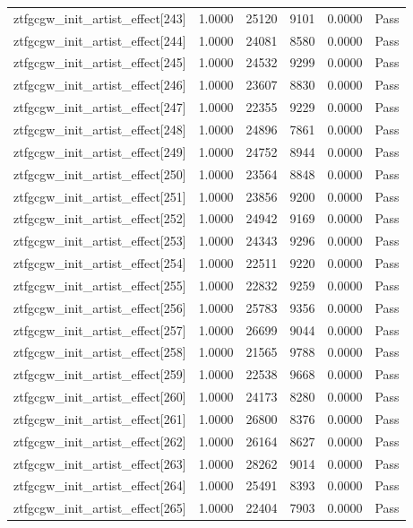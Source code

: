 \begin{table}[htbp]
\begin{tabular}{llrrll}
ztfgcgw\_init\_artist\_effect[243] & 1.0000 & 25120 & 9101 & 0.0000 & Pass \\
ztfgcgw\_init\_artist\_effect[244] & 1.0000 & 24081 & 8580 & 0.0000 & Pass \\
ztfgcgw\_init\_artist\_effect[245] & 1.0000 & 24532 & 9299 & 0.0000 & Pass \\
ztfgcgw\_init\_artist\_effect[246] & 1.0000 & 23607 & 8830 & 0.0000 & Pass \\
ztfgcgw\_init\_artist\_effect[247] & 1.0000 & 22355 & 9229 & 0.0000 & Pass \\
ztfgcgw\_init\_artist\_effect[248] & 1.0000 & 24896 & 7861 & 0.0000 & Pass \\
ztfgcgw\_init\_artist\_effect[249] & 1.0000 & 24752 & 8944 & 0.0000 & Pass \\
ztfgcgw\_init\_artist\_effect[250] & 1.0000 & 23564 & 8848 & 0.0000 & Pass \\
ztfgcgw\_init\_artist\_effect[251] & 1.0000 & 23856 & 9200 & 0.0000 & Pass \\
ztfgcgw\_init\_artist\_effect[252] & 1.0000 & 24942 & 9169 & 0.0000 & Pass \\
ztfgcgw\_init\_artist\_effect[253] & 1.0000 & 24343 & 9296 & 0.0000 & Pass \\
ztfgcgw\_init\_artist\_effect[254] & 1.0000 & 22511 & 9220 & 0.0000 & Pass \\
ztfgcgw\_init\_artist\_effect[255] & 1.0000 & 22832 & 9259 & 0.0000 & Pass \\
ztfgcgw\_init\_artist\_effect[256] & 1.0000 & 25783 & 9356 & 0.0000 & Pass \\
ztfgcgw\_init\_artist\_effect[257] & 1.0000 & 26699 & 9044 & 0.0000 & Pass \\
ztfgcgw\_init\_artist\_effect[258] & 1.0000 & 21565 & 9788 & 0.0000 & Pass \\
ztfgcgw\_init\_artist\_effect[259] & 1.0000 & 22538 & 9668 & 0.0000 & Pass \\
ztfgcgw\_init\_artist\_effect[260] & 1.0000 & 24173 & 8280 & 0.0000 & Pass \\
ztfgcgw\_init\_artist\_effect[261] & 1.0000 & 26800 & 8376 & 0.0000 & Pass \\
ztfgcgw\_init\_artist\_effect[262] & 1.0000 & 26164 & 8627 & 0.0000 & Pass \\
ztfgcgw\_init\_artist\_effect[263] & 1.0000 & 28262 & 9014 & 0.0000 & Pass \\
ztfgcgw\_init\_artist\_effect[264] & 1.0000 & 25491 & 8393 & 0.0000 & Pass \\
ztfgcgw\_init\_artist\_effect[265] & 1.0000 & 22404 & 7903 & 0.0000 & Pass \\

\end{tabular}
\end{table}
